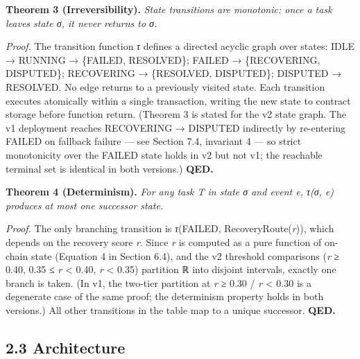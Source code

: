 \documentclass[
  10pt,
]{article}
\begin{document}
\textbf{Theorem 3 (Irreversibility).} \emph{State transitions are
monotonic: once a task leaves state σ, it never returns to σ.}

\emph{Proof.} The transition function \emph{τ} defines a directed
acyclic graph over states: IDLE → RUNNING → \{FAILED, RESOLVED\}; FAILED
→ \{RECOVERING, DISPUTED\}; RECOVERING → \{RESOLVED, DISPUTED\};
DISPUTED → RESOLVED. No edge returns to a previously visited state. Each
transition executes atomically within a single transaction, writing the
new state to contract storage before function return. (Theorem 3 is
stated for the v2 state graph. The v1 deployment reaches RECOVERING →
DISPUTED indirectly by re-entering FAILED on fallback failure --- see
Section 7.4, invariant 4 --- so strict monotonicity over the FAILED
state holds in v2 but not v1; the reachable terminal set is identical in
both versions.) \textbf{QED.}

\textbf{Theorem 4 (Determinism).} \emph{For any task T in state σ and
event e, τ(σ, e) produces at most one successor state.}

\emph{Proof.} The only branching transition is \emph{τ}(FAILED,
RecoveryRoute(\emph{r})), which depends on the recovery score \emph{r}.
Since \emph{r} is computed as a pure function of on-chain state
(Equation 4 in Section 6.4), and the v2 threshold comparisons (\emph{r}
≥ 0.40, 0.35 ≤ \emph{r} \textless{} 0.40, \emph{r} \textless{} 0.35)
partition ℝ into disjoint intervals, exactly one branch is taken. (In
v1, the two-tier partition at \emph{r} ≥ 0.30 / \emph{r} \textless{}
0.30 is a degenerate case of the same proof; the determinism property
holds in both versions.) All other transitions in the table map to a
unique successor. \textbf{QED.}

\hypertarget{architecture}{%
\subsection{2.3 Architecture}\label{architecture}}
\end{document}
